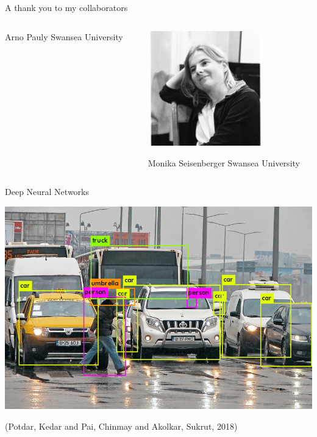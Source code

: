 \documentclass[smaller]{beamer}
\begin{document}
\begin{frame}[label={sec:orga0aa074}]{A thank you to my collaborators}
\begin{columns}
\begin{column}{0.3\columnwidth}
\begin{center}
Arno Pauly
Swansea University
\end{center}
\end{column}

\begin{column}{0.3\columnwidth}
\begin{center}
\includegraphics[width=0.7\textwidth]{images/Monika-Seisenberger.jpg}
\end{center}

\begin{center}
Monika Seisenberger
Swansea University
\end{center}
\end{column}
\end{columns}
\end{frame}

\begin{frame}[label={sec:org39ac04b}]{Deep Neural Networks}
\begin{center}
\includegraphics[width=.9\linewidth]{images/Object-detection-in-a-dense-scene.jpg}
\end{center}
(Potdar, Kedar and Pai, Chinmay and Akolkar, Sukrut, 2018)
\end{frame}
\end{document}
